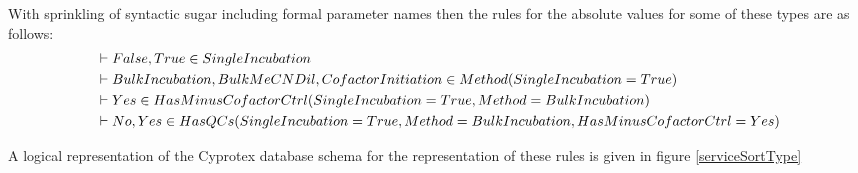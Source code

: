 \documentclass[12pt,a4paper]{article}
\begin{document}
\noindent With sprinkling of syntactic sugar including formal parameter names then the rules for the
absolute values for some of these types are as follows: \\
\begin{align*}
& \vdash False,True \in SingleIncubation \\
& \vdash Bulk Incubation, BulkMeCNDil,Cofactor Initiation \in Method(SingleIncubation=True) \\
& \vdash Yes \in HasMinusCofactorCtrl(SingleIncubation=True,Method=Bulk Incubation) \\
& \vdash No,Yes \in HasQCs(SingleIncubation=True,Method=Bulk Incubation,HasMinusCofactorCtrl=Yes) \\
\end{align*}

\noindent
A logical representation of the Cyprotex database schema for the representation of these rules is 
given in figure \ref{serviceSortType} \\



\end{document}
